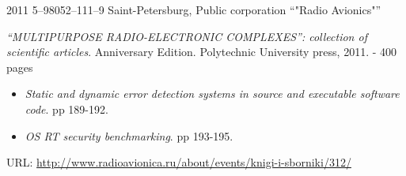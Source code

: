 

\begin{entrylist}
    \entry
    {2011}
    {5–98052–111–9}
    {Saint-Petersburg, Public corporation \enquote{"Radio Avionics"}}
    {\textit{\enquote{MULTIPURPOSE RADIO-ELECTRONIC COMPLEXES}: collection of scientific articles}. Anniversary Edition. Polytechnic University press, 2011. - 400 pages
    \begin{itemize}
        \item \textit{Static and dynamic error detection systems in source and executable software code}. pp 189-192.
        \item \textit{OS RT security benchmarking}. pp 193-195.
    \end{itemize}
    URL: \url{http://www.radioavionica.ru/about/events/knigi-i-sborniki/312/}
    }
\end{entrylist}
